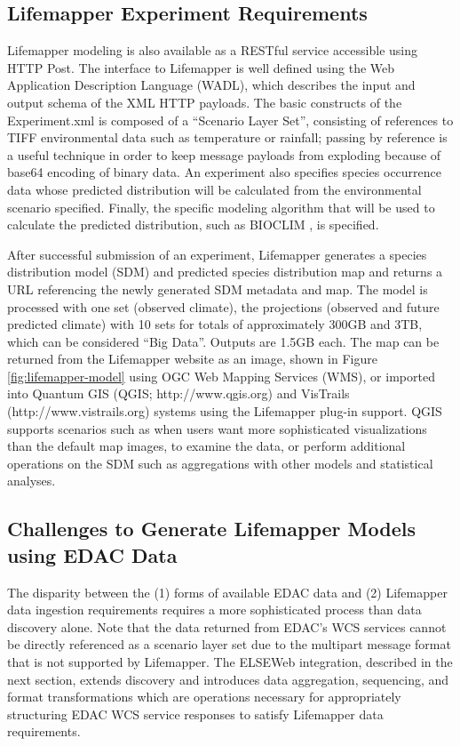 \documentclass[letterpaper]{article}
\begin{document}
\subsection{Lifemapper Experiment Requirements}
Lifemapper modeling is also available as a RESTful service accessible using HTTP Post. The  interface to Lifemapper is well defined using the Web Application Description Language (WADL), which describes the input and output schema of the XML HTTP payloads.  The basic constructs of the Experiment.xml is composed of a ``Scenario Layer Set'', consisting of references to TIFF environmental data such as temperature or rainfall; passing by reference is a useful technique in order to keep message payloads from exploding because of base64 encoding of binary data. An experiment also specifies species occurrence data whose predicted distribution will be calculated from the environmental scenario specified. Finally, the specific modeling algorithm that will be used to calculate the predicted distribution, such as BIOCLIM \cite{busby1991bioclim}, is specified.

After successful submission of an experiment, Lifemapper generates a species distribution model (SDM) and predicted species distribution map and returns a URL referencing the newly generated SDM metadata and map. The model is processed with one set (observed climate), the projections (observed and future predicted climate) with 10 sets for totals of approximately 300GB and 3TB, which can be considered ``Big Data''. Outputs are 1.5GB each. The map can be returned from the Lifemapper website as an image, shown in Figure \ref{fig:lifemapper-model} using OGC Web Mapping Services (WMS), or imported into Quantum GIS (QGIS; http://www.qgis.org) and VisTrails (http://www.vistrails.org) systems using the Lifemapper plug-in support. QGIS supports scenarios such as when users want more sophisticated visualizations than the default map images, to examine the data, or perform additional operations on the SDM such as aggregations with other models and statistical analyses.

\subsection{Challenges to Generate Lifemapper Models using EDAC Data}
The disparity between the (1) forms of available EDAC data and (2) Lifemapper data ingestion requirements requires a more sophisticated process than data discovery alone. Note that the data returned from EDAC's WCS services cannot be directly referenced as a scenario layer set due to the multipart message format that is not supported by Lifemapper. The ELSEWeb integration, described in the next section, extends discovery and introduces data aggregation, sequencing, and format transformations which are operations necessary for appropriately structuring EDAC WCS service responses to satisfy Lifemapper data requirements. 
\end{document}
